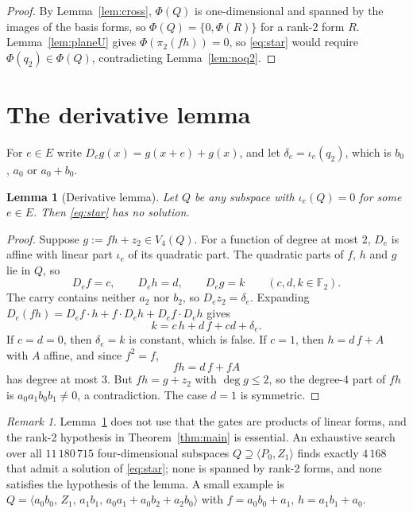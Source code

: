 \documentclass[11pt,a4paper]{article}
\theoremstyle{plain}
\newtheorem{lemma}[theorem]{Lemma}
\theoremstyle{definition}
\theoremstyle{remark}
\newtheorem{remark}[theorem]{Remark}
\newcommand{\F}{\mathbb{F}_2}
\newcommand{\Dir}{E}
\begin{document}
\begin{proof}
By Lemma~\ref{lem:cross}, $\Phi(Q)$ is one-dimensional and spanned by the images of the basis forms, so $\Phi(Q)=\{0,\Phi(R)\}$ for a rank-2 form $R$. Lemma~\ref{lem:planeU} gives $\Phi(\pi_2(fh))=0$, so \eqref{eq:star} would require $\Phi(q_2)\in\Phi(Q)$, contradicting Lemma~\ref{lem:noq2}.
\end{proof}

\section{The derivative lemma}

For $e\in\Dir$ write $D_eg(x)=g(x+e)+g(x)$, and let $\delta_e=\iota_e(q_2)$, which is $b_0$, $a_0$ or $a_0+b_0$.

\begin{lemma}[Derivative lemma]\label{lem:deriv}
Let $Q$ be any subspace with $\iota_e(Q)=0$ for some $e\in\Dir$. Then \eqref{eq:star} has no solution.
\end{lemma}

\begin{proof}
Suppose $g:=fh+z_2\in V_4(Q)$. For a function of degree at most $2$, $D_e$ is affine with linear part $\iota_e$ of its quadratic part. The quadratic parts of $f$, $h$ and $g$ lie in $Q$, so
\[
  D_ef=c,\qquad D_eh=d,\qquad D_eg=k\qquad(c,d,k\in\F).
\]
The carry contains neither $a_2$ nor $b_2$, so $D_ez_2=\delta_e$. Expanding $D_e(fh)=D_ef\cdot h+f\cdot D_eh+D_ef\cdot D_eh$ gives
\[
  k=c\,h+d\,f+cd+\delta_e .
\]
If $c=d=0$, then $\delta_e=k$ is constant, which is false. If $c=1$, then $h=d\,f+A$ with $A$ affine, and since $f^2=f$,
\[
  fh=d\,f+f A
\]
has degree at most $3$. But $fh=g+z_2$ with $\deg g\le2$, so the degree-4 part of $fh$ is $a_0a_1b_0b_1\neq0$, a contradiction. The case $d=1$ is symmetric.
\end{proof}

\begin{remark}
Lemma~\ref{lem:deriv} does not use that the gates are products of linear forms, and the rank-2 hypothesis in Theorem~\ref{thm:main} is essential. An exhaustive search over all $11\,180\,715$ four-dimensional subspaces $Q\supseteq\langle P_0,Z_1\rangle$ finds exactly $4\,168$ that admit a solution of \eqref{eq:star}; none is spanned by rank-2 forms, and none satisfies the hypothesis of the lemma. A small example is $Q=\langle a_0b_0,\,Z_1,\,a_1b_1,\,a_0a_1+a_0b_2+a_2b_0\rangle$ with $f=a_0b_0+a_1$, $h=a_1b_1+a_0$.
\end{remark}
\end{document}
